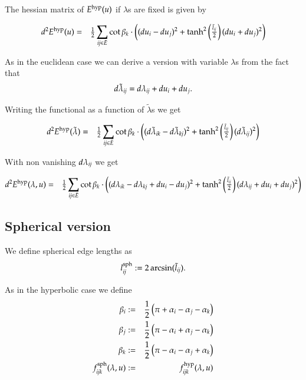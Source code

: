 \documentclass[Thesis.tex]{subfiles}
\begin{document}
The hessian matrix of $E^{\rm hyp}(u)$ if $\lambda$s are fixed is given by

\begin{eqnarray*}
d^2E^{\rm hyp}(u)
&=&\tfrac{1}{2}\sum_{\it ij\in \bar E} \cot\beta_k \cdot \left((du_i-du_j)^2+
\tanh^2\left(\tfrac{\tilde l_{\it ij}}{2}\right)(du_i+du_j)^2\right)
\end{eqnarray*}
 
As in the euclidean case we can derive a version with variable $\lambda$s from the fact that 
\begin{equation*}
d\tilde \lambda_{\it ij}=d\lambda_{\it ij}+du_i+du_j.
\end{equation*}

Writing the functional as a function of $\tilde \lambda$s we get 

\begin{eqnarray*}
 d^2E^{\rm hyp}(\tilde \lambda) &=&
 \tfrac{1}{2}\sum_{\it ij\in \bar{E}} \cot\beta_k \cdot \left((d\tilde\lambda_{\it ik}-d\tilde\lambda_{\it kj})^2+\tanh^2\left(\tfrac{\tilde l_{\it ij}}{2}\right)(d\tilde\lambda_{\it ij})^2\right)
\end{eqnarray*}

With non vanishing $d\lambda_{\it ij}$ we get
  
\begin{eqnarray*}
d^2E^{\rm hyp}(\lambda, u)
&=& \tfrac{1}{2}\sum_{\it ij\in \bar{E}} \cot\beta_k \cdot 
 \left((d\lambda_{\it ik}-d\lambda_{\it kj} +  du_i-du_j)^2+\tanh^2\left(\tfrac{\tilde l_{\it ij}}{2}\right)(d\lambda_{\it ij} +du_i+du_j)^2\right)
\end{eqnarray*}

\subsection{Spherical version}
We define spherical edge lengths as 
\begin{equation}
l^{\rm sph}_{\it ij} := 2\arcsin(\tilde l_{\it ij}).\label{eq:spherical_lengths}
\end{equation}

As in the hyperbolic case we define
\begin{eqnarray*}
	\beta_i &:=& \frac{1}{2} \left(\pi + \alpha_i - \alpha_j - \alpha_k \right)\\
	\beta_j &:=& \frac{1}{2} \left(\pi - \alpha_i + \alpha_j - \alpha_k \right)\\
	\beta_k &:=& \frac{1}{2} \left(\pi - \alpha_i - \alpha_j + \alpha_k \right)\\
	f^{\rm sph}_{\it ijk}(\lambda, u) &:=& f^{\rm hyp}_{\it ijk}(\lambda, u)
\end{eqnarray*}	
\end{document}
